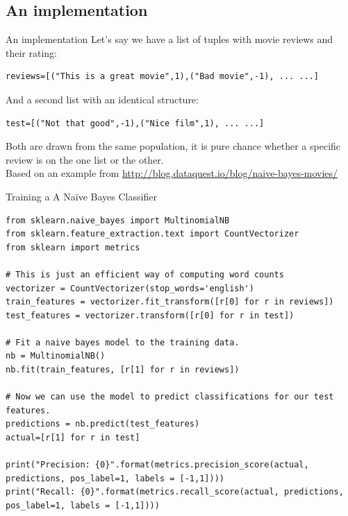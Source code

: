 \documentclass{beamer}
\begin{document}
\subsection{An implementation}

\begin{frame}[fragile]{An implementation}
Let's say we have a list of tuples with movie reviews and their rating:
\begin{lstlisting}
reviews=[("This is a great movie",1),("Bad movie",-1), ... ...]
\end{lstlisting}
And a second list with an identical structure:
\begin{lstlisting}
test=[("Not that good",-1),("Nice film",1), ... ...]
\end{lstlisting}
Both are drawn from the same population, it is pure chance whether a specific review is on the one list or the other.\\
\tiny{Based on an example from \url{http://blog.dataquest.io/blog/naive-bayes-movies/}}
\end{frame}


\begin{frame}[fragile]{Training a A Naïve Bayes Classifier}
\begin{lstlisting}
from sklearn.naive_bayes import MultinomialNB
from sklearn.feature_extraction.text import CountVectorizer
from sklearn import metrics
 
# This is just an efficient way of computing word counts
vectorizer = CountVectorizer(stop_words='english')
train_features = vectorizer.fit_transform([r[0] for r in reviews])
test_features = vectorizer.transform([r[0] for r in test])
 
# Fit a naive bayes model to the training data.
nb = MultinomialNB()
nb.fit(train_features, [r[1] for r in reviews])
 
# Now we can use the model to predict classifications for our test features.
predictions = nb.predict(test_features)
actual=[r[1] for r in test]

print("Precision: {0}".format(metrics.precision_score(actual, predictions, pos_label=1, labels = [-1,1])))
print("Recall: {0}".format(metrics.recall_score(actual, predictions, pos_label=1, labels = [-1,1])))
\end{lstlisting}
\end{frame}
%
\end{document}

